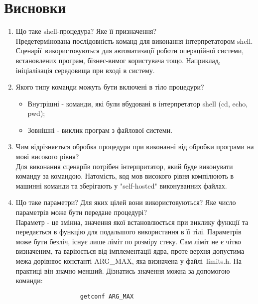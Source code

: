\section{Висновки}
\label{sec:summary}

\begin{enumerate}
      \item Що таке shell-процедура? Яке її призначення? \\
            Предетермінована послідовність команд для виконання інтерпретатором shell.
            Сценарії використовуються для автоматизації роботи операційної системи,
            встановлених програм, бізнес-вимог користувача тощо.
            Наприклад, ініціалізація середовища при вході в систему.
      \item Якого типу команди можуть бути включені в тіло процедури?
            \begin{itemize}
                  \item Внутрішні - команди, які були вбудовані в інтерпретатор shell (cd, echo, pwd);
                  \item Зовнішні - виклик програм з файлової системи.
            \end{itemize}
      \item Чим відрізняється обробка процедури при виконанні
            від обробки програми на мові високого рівня? \\
            Для виконання сценаріїв потрібен інтерпритатор,
            який буде виконувати команду за командою.
            Натомість, код мов високого рівня компілюють в машинні команди
            та зберігають у "self-hosted" виконуванних файлах.
      \item Що таке параметри? Для яких цілей вони використовуються?
            Яке число параметрів може бути передане процедурі? \\
            Параметр - це змінна, значення якої встановлюється при виклику функції
            та передається в функцію для подальшого використання в її тілі.
            Параметрів може бути безліч, існує лише ліміт по розміру стеку.
            Сам ліміт не є чітко визначеним, та варіюється від імплементації ядра,
            проте верхня допустима межа дорівнює константі ARG\_MAX,
            яка визначена у файлі limits.h. На практиці він значно менший.
            Дізнатись значення можна за допомогою команди:
            \begin{verbatim}
                  getconf ARG_MAX
            \end{verbatim}

\end{enumerate}
